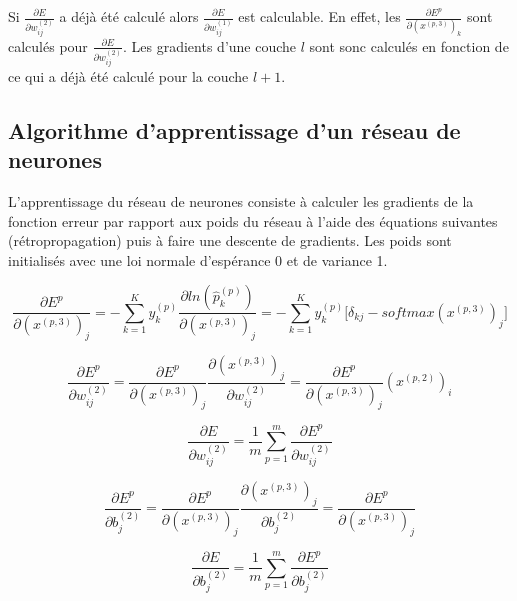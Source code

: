 \documentclass[a4paper,11pt,oneside,roman]{article}
\begin{document}
    Si $\frac{\partial E}{\partial w_{ij}^{(2)}}$ a déjà été calculé alors $\frac{\partial E}{\partial w_{ij}^{(1)}}$ est calculable. En effet, les $\frac{\partial E^p}{\partial (x^{(p,3)})_k}$ sont calculés pour $\frac{\partial E}{\partial w_{ij}^{(2)}}$.
    Les gradients d'une couche $l$ sont sonc calculés en fonction de ce qui a déjà été calculé pour la couche $l+1$.

    \subsection{Algorithme d'apprentissage d'un réseau de neurones}

    L'apprentissage du réseau de neurones consiste à calculer les gradients de la fonction erreur par rapport aux poids du réseau à l'aide des équations suivantes (rétropropagation) puis à faire une descente de gradients.
    Les poids sont initialisés avec une loi normale d'espérance 0 et de variance 1.

    \begin{equation}
        \nonumber
        \frac{\partial E^p}{\partial (x^{(p,3)})_{j}} = -\sum\limits_{k=1}^{K} y_k^{(p)} \frac{\partial ln(\hat{p}_{k}^{(p)})}{\partial (x^{(p,3)})_{j}} = - \sum\limits_{k=1}^{K} y_k^{(p)} \bigg[ \delta_{kj} - softmax(x^{(p,3)})_j \bigg]
    \end{equation}

    \begin{equation}
        \nonumber
        \frac{\partial E^p}{\partial w_{ij}^{(2)}} = \frac{\partial E^p}{\partial (x^{(p,3)})_{j}} \frac{\partial (x^{(p,3)})_{j}}{\partial w_{ij}^{(2)}} = \frac{\partial E^p}{\partial (x^{(p,3)})_{j}} (x^{(p,2)})_i
    \end{equation}

    \begin{equation}
        \nonumber
        \frac{\partial E}{\partial w_{ij}^{(2)}} = \frac{1}{m} \sum\limits_{p=1}^{m} \frac{\partial E^p}{\partial w_{ij}^{(2)}}
    \end{equation}

    \begin{equation}
        \nonumber
        \frac{\partial E^p}{\partial b_j^{(2)}} = \frac{\partial E^p}{\partial (x^{(p,3)})_{j}} \frac{\partial (x^{(p,3)})_{j}}{\partial b_{j}^{(2)}} = \frac{\partial E^p}{\partial (x^{(p,3)})_{j}}
    \end{equation}

    \begin{equation}
        \nonumber
        \frac{\partial E}{\partial b_{j}^{(2)}} = \frac{1}{m} \sum\limits_{p=1}^{m} \frac{\partial E^p}{\partial b_{j}^{(2)}}
    \end{equation}
\end{document}
